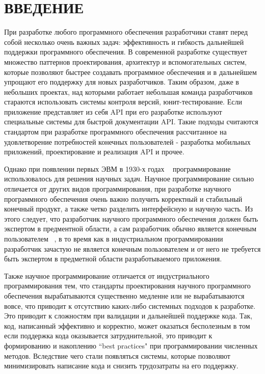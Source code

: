 \chapter*{ВВЕДЕНИЕ}\label{chap.introduction}


При разработке любого программного обеспечения разработчики ставят перед собой несколько очень важных задач: эффективность и гибкость дальнейшей поддержки программного обеспечения. В современной разработке существует множество паттернов проектирования, архитектур и вспомогательных систем, которые позволяют быстрее создавать программное обеспечения и в дальнейшем упрощают его поддержку для новых разработчиков. Таким образом, даже в небольших проектах, над которыми работает небольшая команда разработчиков стараются использовать системы контроля версий, юнит-тестирование. Если приложение представляет из себя API при его разработке используют специальные системы для быстрой документации API. Такие подходы считаются стандартом при разработке программного обеспечения рассчитанное на удовлетворение потребностей конечных пользователей - разработка мобильных приложений, проектирование и реализация API и прочее.

Однако при появлении первых ЭВМ в 1930-х годах ~\cite{FirstComputers} программирование использовалось для решения научных задач. Научное программирование сильно отличается от других видов программирования, при разработке научного программного обеспечения очень важно получить корректный и стабильный конечный продукт, а также четко разделить интерфейсную и научную часть. Из этого следует, что разработчик научного программного обеспечения должен быть экспертом в предментной области, а сам разработчик обычно является конечным пользователем ~\cite{ScientificDevelopment}, в то время как в индустриальном программировании разработчик зачастую не является конечным пользователем и от него не требуется быть экспертом в предметной области разработываемого приложения.

Также научное программирование отличается от индустриального программирования тем, что стандарты проектирования научного программного обеспечения вырабатываются существенно медленне или не вырабатываются вовсе, что приводит к отсутствию каких-либо системных подходов к разработке. Это приводит к сложностям при валидации и дальнейшей поддержке кода. Так, код, написанный эффективно и корректно, может оказаться бесполезным в том  если поддержка кода оказывается затруднительной, это приводит к формированию и накоплению ``best practices" при программировании численных методов. Вследствие чего стали появляться системы, которые позволяют минимизировать написание кода и снизить трудозатраты на его поддержку.

